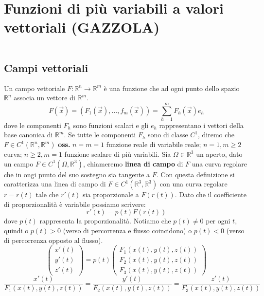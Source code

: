 \section*{Funzioni di più variabili a valori vettoriali (GAZZOLA)}
\rule{\textwidth}{2pt}
\subsection*{Campi vettoriali}
Un campo vettoriale $F: \mathbb{R}^n \rightarrow  \mathbb{R}^m$ è una funzione che ad ogni  punto dello spazio $\mathbb{R}^n$ associa un vettore di $\mathbb{R}^m$.
\[
    F(\vec{x}) = \left(F_1(\vec{x}), \dots, f_m(\vec{x})\right) = \sum_{h=1}^{m} F_h(\vec{x})e_h
\]
dove le componenti $F_h$ sono funzioni scalari e gli $e_h$ rappresentano i vettori della base canonica di $\mathbb{R}^m$. Se tutte le componenti $F_h$ sono di classe $C^1$, diremo che $F \in C^1(\mathbb{R}^n, \mathbb{R}^m)$\newline
\newline
\textbf{oss.} $n=m=1$ funzione reale di variabile reale; $n=1, m \geq 2$ curva; $n \geq 2, m = 1$ funzione scalare di più variabili.\newline
\newline
Sia $\Omega \in \mathbb{R}^3$ un aperto, dato un campo $F \in C^1(\Omega, \mathbb{R}^3)$, chiameremo \textbf{linea di campo} di $F$ una curva regolare che in ongi punto del suo sostegno sia tangente a $F$.\newline
Con questa definizione si caratterizza una linea di campo di $F \in C^1(\mathbb{R}^3, \mathbb{R}^3)$ con una curva regolare $r = r(t)$ tale che $r'(t)$ sia proporzionale a $F(r(t))$. Dato che il coefficiente di proporzionalità è variabile possiamo scrivere:
\[
    r'(t) = p(t) F(r(t))
\]
dove $p(t)$ rappresenta la proporzionalità. Notiamo che $p(t) \neq 0$ per ogni $t$, quindi o $p(t) > 0$ (verso di percorrenza e flusso coincidono) o $p(t) < 0$ (verso di percorrenza opposto al flusso).
\[
    \left(\begin{matrix}
        x'(t)\\
        y'(t)\\
        z'(t)
    \end{matrix}\right) = p(t) \left(\begin{matrix}
        F_1(x(t),y(t),z(t))\\
        F_2(x(t),y(t),z(t))\\
        F_3(x(t),y(t),z(t))
    \end{matrix}\right)
\]
\[
    \frac{x'(t)}{F_1(x(t),y(t),z(t))} = 
    \frac{y'(t)}{F_2(x(t),y(t),z(t))} = 
    \frac{z'(t)}{F_3(x(t),y(t),z(t))}
\]
